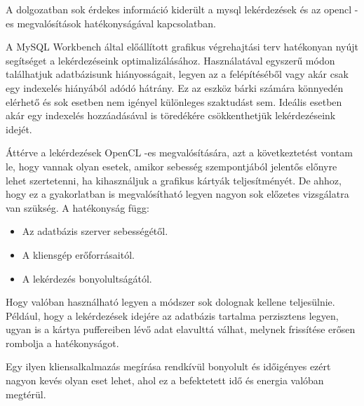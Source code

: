 
A dolgozatban sok érdekes információ kiderült a mysql lekérdezések és az opencl -es megvalósítások hatékonyságával kapcsolatban.

A MySQL Workbench által előállított grafikus végrehajtási terv hatékonyan nyújt segítséget a lekérdezéseink optimalizálásához. Használatával egyszerű módon találhatjuk adatbázisunk hiányosságait, legyen az a felépítéséből vagy akár csak egy indexelés hiányából adódó hátrány. Ez az eszköz bárki számára könnyedén elérhető és sok esetben nem igényel különleges szaktudást sem. Ideális esetben akár egy indexelés hozzáadásával is töredékére csökkenthetjük lekérdezéseink idejét.

Áttérve a lekérdezések OpenCL -es megvalósítására, azt a következtetést vontam le, hogy vannak olyan esetek, amikor sebesség szempontjából jelentős előnyre lehet szertetenni, ha kihasználjuk a grafikus kártyák teljesítményét. De ahhoz, hogy ez a gyakorlatban is megvalósítható legyen nagyon sok előzetes vizsgálatra van szükség. A hatékonyság függ:
\begin{itemize}
\item Az adatbázis szerver sebességétől.
\item A kliensgép erőforrásaitól.
\item A lekérdezés bonyolultságától.
\end{itemize}
Hogy valóban használható legyen a módszer sok dolognak kellene teljesülnie.
Például, hogy a lekérdezések idejére az adatbázis tartalma perzisztens legyen, ugyan is a kártya puffereiben lévő adat elavulttá válhat, melynek frissítése erősen rombolja a hatékonyságot. 

Egy ilyen kliensalkalmazás megírása rendkívül bonyolult és időigényes ezért nagyon kevés olyan eset lehet, ahol ez a befektetett idő és energia valóban megtérül. 
